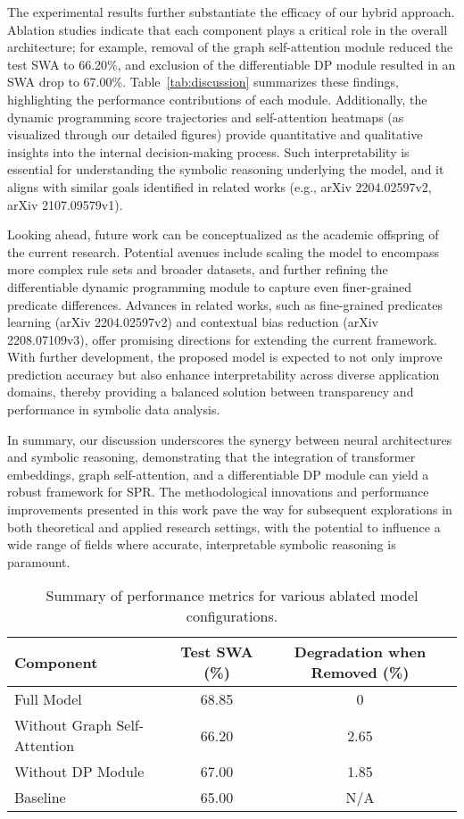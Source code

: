 \documentclass{article}
\begin{document}
The experimental results further substantiate the efficacy of our hybrid approach. Ablation studies indicate that each component plays a critical role in the overall architecture; for example, removal of the graph self-attention module reduced the test SWA to 66.20\%, and exclusion of the differentiable DP module resulted in an SWA drop to 67.00\%. Table~\ref{tab:discussion} summarizes these findings, highlighting the performance contributions of each module. Additionally, the dynamic programming score trajectories and self-attention heatmaps (as visualized through our detailed figures) provide quantitative and qualitative insights into the internal decision-making process. Such interpretability is essential for understanding the symbolic reasoning underlying the model, and it aligns with similar goals identified in related works (e.g., arXiv 2204.02597v2, arXiv 2107.09579v1).

Looking ahead, future work can be conceptualized as the academic offspring of the current research. Potential avenues include scaling the model to encompass more complex rule sets and broader datasets, and further refining the differentiable dynamic programming module to capture even finer-grained predicate differences. Advances in related works, such as fine-grained predicates learning (arXiv 2204.02597v2) and contextual bias reduction (arXiv 2208.07109v3), offer promising directions for extending the current framework. With further development, the proposed model is expected to not only improve prediction accuracy but also enhance interpretability across diverse application domains, thereby providing a balanced solution between transparency and performance in symbolic data analysis.

In summary, our discussion underscores the synergy between neural architectures and symbolic reasoning, demonstrating that the integration of transformer embeddings, graph self-attention, and a differentiable DP module can yield a robust framework for SPR. The methodological innovations and performance improvements presented in this work pave the way for subsequent explorations in both theoretical and applied research settings, with the potential to influence a wide range of fields where accurate, interpretable symbolic reasoning is paramount.
\label{tab:discussion}
\begin{table}[H]
\centering
\begin{tabular}{lcc}
\hline
Component & Test SWA (\%) & Degradation when Removed (\%) \\
\hline
Full Model                    & 68.85   & 0    \\
Without Graph Self-Attention  & 66.20   & 2.65 \\
Without DP Module             & 67.00   & 1.85 \\
Baseline                      & 65.00   & N/A  \\
\hline
\end{tabular}
\caption{Summary of performance metrics for various ablated model configurations.}
\end{table}
\end{document}

